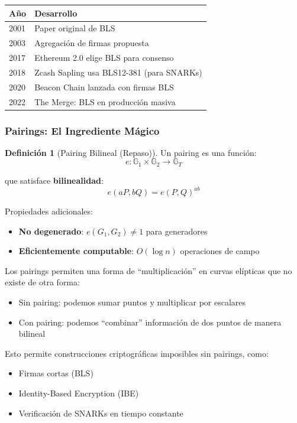 \documentclass[11pt,a4paper,twoside,openright]{book}
\theoremstyle{definition}
\newtheorem{definition}{Definición}[chapter]
\theoremstyle{plain}
\theoremstyle{remark}
\newcommand{\G}{\mathbb{G}}
\begin{document}
\begin{center}
\begin{tabular}{ll}
\toprule
\textbf{Año} & \textbf{Desarrollo} \\
\midrule
2001 & Paper original de BLS \\
2003 & Agregación de firmas propuesta \\
2017 & Ethereum 2.0 elige BLS para consenso \\
2018 & Zcash Sapling usa BLS12-381 (para SNARKs) \\
2020 & Beacon Chain lanzada con firmas BLS \\
2022 & The Merge: BLS en producción masiva \\
\bottomrule
\end{tabular}
\end{center}

\subsubsection{Pairings: El Ingrediente Mágico}

\begin{definition}[Pairing Bilineal (Repaso)]
Un pairing es una función:
\[ e: \G_1 \times \G_2 \to \G_T \]

que satisface \textbf{bilinealidad}:
\[ e(aP, bQ) = e(P, Q)^{ab} \]

Propiedades adicionales:
\begin{itemize}
    \item \textbf{No degenerado}: $e(G_1, G_2) \neq 1$ para generadores
    \item \textbf{Eficientemente computable}: $O(\log n)$ operaciones de campo
\end{itemize}
\end{definition}

\begin{keyidea}
Los pairings permiten una forma de ``multiplicación'' en curvas elípticas que no existe de otra forma:
\begin{itemize}
    \item Sin pairing: podemos sumar puntos y multiplicar por escalares
    \item Con pairing: podemos ``combinar'' información de dos puntos de manera bilineal
\end{itemize}

Esto permite construcciones criptográficas imposibles sin pairings, como:
\begin{itemize}
    \item Firmas cortas (BLS)
    \item Identity-Based Encryption (IBE)
    \item Verificación de SNARKs en tiempo constante
\end{itemize}
\end{keyidea}
\end{document}
